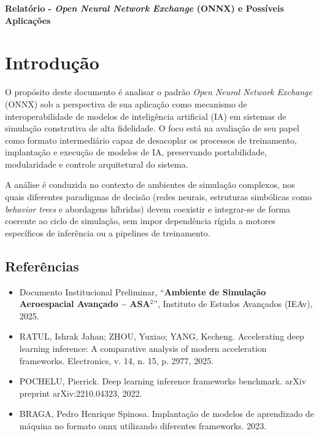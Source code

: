 \begin{center}
    \textbf{\Huge{Relatório - \emph{Open Neural Network Exchange} (ONNX) e Possíveis Aplicações}}
\end{center}

\section{Introdução}

O propósito deste documento é analisar o padrão \emph{Open Neural Network Exchange} (ONNX) sob a perspectiva de sua aplicação como mecanismo de interoperabilidade de modelos de inteligência artificial (IA) em sistemas de simulação construtiva de alta fidelidade. O foco está na avaliação de seu papel como formato intermediário capaz de desacoplar os processos de treinamento, implantação e execução de modelos de IA, preservando portabilidade, modularidade e controle arquitetural do sistema.

A análise é conduzida no contexto de ambientes de simulação complexos, nos quais diferentes paradigmas de decisão (redes neurais, estruturas simbólicas como \emph{behavior trees} e abordagens híbridas) devem coexistir e integrar-se de forma coerente ao ciclo de simulação, sem impor dependência rígida a motores específicos de inferência ou a pipelines de treinamento.


\subsection{Referências}

\begin{itemize}
    \item Documento Institucional Preliminar, ``\textbf{Ambiente de Simulação Aeroespacial Avançado -- ASA$^{2}$}'', Instituto de Estudos Avançados (IEAv), 2025.
    \item RATUL, Ishrak Jahan; ZHOU, Yuxiao; YANG, Kecheng. Accelerating deep learning inference: A comparative analysis of modern acceleration frameworks. Electronics, v. 14, n. 15, p. 2977, 2025.
    \item POCHELU, Pierrick. Deep learning inference frameworks benchmark. arXiv preprint arXiv:2210.04323, 2022.
    \item BRAGA, Pedro Henrique Spinosa. Implantação de modelos de aprendizado de máquina no formato onnx utilizando diferentes frameworks. 2023.
\end{itemize}

\newpage

